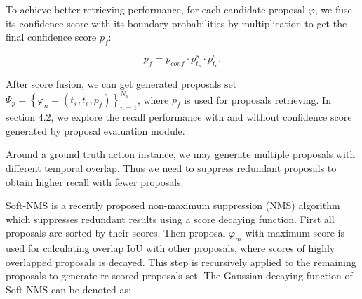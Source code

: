 \documentclass[runningheads]{llncs}
\begin{document}
To achieve better retrieving performance, for each candidate proposal $\varphi$,  we fuse its confidence score with its boundary probabilities by multiplication to get the final confidence score $p_{f}$:

\begin{equation}
p_{f}=p_{conf} \cdot p^s_{t_s} \cdot p^e_{t_e} .
\end{equation}

After score fusion, we can get generated proposals set $\Psi_p  = \left \{ \varphi  _n=(t_s,t_e,p_{f}  ) \right \}_{n=1}^{N_p}$, where $p_{f}$ is used for proposals retrieving. In section 4.2, we explore the recall performance with and without confidence score generated by proposal evaluation module.

Around a ground truth action instance, we may generate multiple proposals with different temporal overlap. Thus we need to suppress redundant proposals to obtain higher recall with fewer proposals.

Soft-NMS \cite{softNMS} is a recently proposed non-maximum suppression (NMS) algorithm which suppresses redundant results using a score decaying function. First all proposals are sorted by their scores. Then proposal $\varphi_m$ with maximum score is used for calculating overlap IoU with other proposals, where scores of highly overlapped proposals is decayed. This step is recursively applied to the remaining proposals to  generate re-scored proposals set. 
The Gaussian decaying function of Soft-NMS can be denoted  as:
\end{document}
